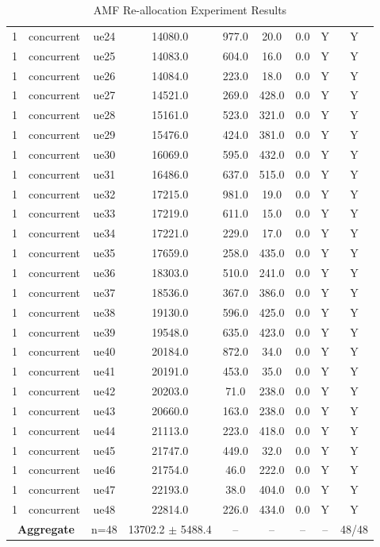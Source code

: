 \begin{table}[ht]
\begin{tabular}{|c|c|c|c|c|c|c|c|c|}
1 & concurrent & ue24 & 14080.0 & 977.0 & 20.0 & 0.0 & Y & Y \\
1 & concurrent & ue25 & 14083.0 & 604.0 & 16.0 & 0.0 & Y & Y \\
1 & concurrent & ue26 & 14084.0 & 223.0 & 18.0 & 0.0 & Y & Y \\
1 & concurrent & ue27 & 14521.0 & 269.0 & 428.0 & 0.0 & Y & Y \\
1 & concurrent & ue28 & 15161.0 & 523.0 & 321.0 & 0.0 & Y & Y \\
1 & concurrent & ue29 & 15476.0 & 424.0 & 381.0 & 0.0 & Y & Y \\
1 & concurrent & ue30 & 16069.0 & 595.0 & 432.0 & 0.0 & Y & Y \\
1 & concurrent & ue31 & 16486.0 & 637.0 & 515.0 & 0.0 & Y & Y \\
1 & concurrent & ue32 & 17215.0 & 981.0 & 19.0 & 0.0 & Y & Y \\
1 & concurrent & ue33 & 17219.0 & 611.0 & 15.0 & 0.0 & Y & Y \\
1 & concurrent & ue34 & 17221.0 & 229.0 & 17.0 & 0.0 & Y & Y \\
1 & concurrent & ue35 & 17659.0 & 258.0 & 435.0 & 0.0 & Y & Y \\
1 & concurrent & ue36 & 18303.0 & 510.0 & 241.0 & 0.0 & Y & Y \\
1 & concurrent & ue37 & 18536.0 & 367.0 & 386.0 & 0.0 & Y & Y \\
1 & concurrent & ue38 & 19130.0 & 596.0 & 425.0 & 0.0 & Y & Y \\
1 & concurrent & ue39 & 19548.0 & 635.0 & 423.0 & 0.0 & Y & Y \\
1 & concurrent & ue40 & 20184.0 & 872.0 & 34.0 & 0.0 & Y & Y \\
1 & concurrent & ue41 & 20191.0 & 453.0 & 35.0 & 0.0 & Y & Y \\
1 & concurrent & ue42 & 20203.0 & 71.0 & 238.0 & 0.0 & Y & Y \\
1 & concurrent & ue43 & 20660.0 & 163.0 & 238.0 & 0.0 & Y & Y \\
1 & concurrent & ue44 & 21113.0 & 223.0 & 418.0 & 0.0 & Y & Y \\
1 & concurrent & ue45 & 21747.0 & 449.0 & 32.0 & 0.0 & Y & Y \\
1 & concurrent & ue46 & 21754.0 & 46.0 & 222.0 & 0.0 & Y & Y \\
1 & concurrent & ue47 & 22193.0 & 38.0 & 404.0 & 0.0 & Y & Y \\
1 & concurrent & ue48 & 22814.0 & 226.0 & 434.0 & 0.0 & Y & Y \\
\multicolumn{2}{|c|}{\textbf{Aggregate}} & n=48 & 13702.2 $\pm$ 5488.4 & -- & -- & -- & -- & 48/48 \\
\hline
\end{tabular}
\caption{AMF Re-allocation Experiment Results}
\label{tab:amf_realloc}
\end{table}
